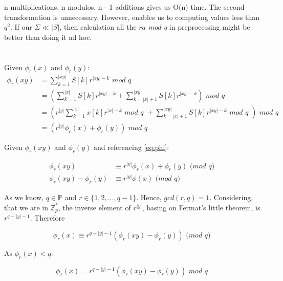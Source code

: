 \documentclass{scrartcl}
\begin{document}
      n multiplications, n modulos, n - 1 additions gives us O(n) time. The second transformation is unnecessary. However, enables us to computing values less than $q^2$. If our $\Sigma\ll |S|$, then
      calculation all the $ra$\textit{ mod q } in preprocessing might be better than doing it ad hoc.
    \section{}
      Given $\phi_r(x)$ and $\phi_r(y)$:
      \begin{equation}\label{eq:phi}
        \begin{split}
          \phi_r(xy) &= \sum_{k=1}^{|xy|}S[k]r^{|xy| - k}\textit{ mod q } \\ &= (\sum_{k=1}^{|x|}S[k]r^{|xy| - k} + \sum_{k=|x| + 1}^{|xy|}S[k]r^{|xy| - k})\textit{ mod q } \\
          &= (r^|y|\sum_{k=1}^{|x|}x[k]r^{|x| - k}\textit{ mod q } + \sum_{k=|x| + 1}^{|xy|}S[k]r^{|xy| - k}\textit{ mod q })\textit{ mod q } \\ &= (r^{|y|}\phi_r(x) + \phi_r(y))\textit{ mod q }
        \end{split}
      \end{equation}
      
      Given $\phi_r(xy)$ and $\phi_r(y)$ and referencing \ref{eq:phi}:
      
      \begin{equation}
        \begin{split}
          \phi_r(xy) &\equiv r^{|y|}\phi_r(x) + \phi_r(y)\textit{ (mod q) } \\
          \phi_r(xy) - \phi_r(y) &\equiv r^{|y|}\phi(x)\textit{ (mod q) }
        \end{split}
      \end{equation}
      
      As we know, $q \in \mathbb{P}$ and $r \in \{1, 2, \dots, q - 1\}$. Hence, $gcd(r, q) = 1$. Considering, that we are in $\mathbb{Z}_p^*$, the inverse element of $r^{|y|}$, basing on Fermat's
      little theorem, is $r^{q - |y| - 1}$. Therefore
      
      \[\phi_r(x) \equiv r^{q - |y| - 1}(\phi_r(xy) - \phi_r(y))\textit{ (mod q) }\]
      
      As $\phi_r(x) < q$:
      
      \[\phi_r(x) = r^{q - |y| - 1}(\phi_r(xy) - \phi_r(y))\textit{ mod q }\]
      
      
\end{document}
